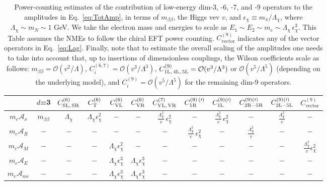 \documentclass[letterpaper,11pt]{article}
\begin{document}
\begin{table}
\center
\footnotesize
\begin{tabular}{||c|ccccccccccc||}
 \hline \hline 
			    & $d$=3  &  $C^{(6)}_{\rm SL,\, SR}$       & $C^{(6)}_{\rm T}$ 		  &  $C^{(6)}_{\rm VL}$  & $C^{(6)}_{\rm VR}$  & $C^{(7)}_{\rm VL, \, VR}$  & $C^{(9)\,(\prime)}_{\rm 1R}$ & $C^{(9)(\prime)}_{\rm 1L}$ & $C^{(9)(\prime)}_{\rm 2R-5R}$ & $C^{(9)(\prime)}_{\rm 2L-5L}$ & $C^{(9)}_{\mathrm{vector}} $ \\
\hline
$m_e \mathcal A_{\nu}$   & $m_{\beta\beta}$ & $\Lambda_{\chi}$  & $\Lambda_{\chi} \epsilon^2_\chi$ &  $-$  &  $-$ & $ \frac{\Lambda_\chi^2}{v} \, \epsilon_\chi^2$  & $-$ & $\frac{\Lambda_\chi^2}{v} \, \epsilon_\chi^2$ & $ -$ & $\frac{\Lambda_\chi^2}{v} $ & $-$\\
$m_e \mathcal A_{R}$   & $-$ & $-$  & $-$ &  $-$  &  $-$ &   $-$  & $ \frac{\Lambda_\chi^2}{v} \, \epsilon_\chi^2$ & $-$ & $ \frac{\Lambda_\chi^2}{v}$ & $-$ & $-$ \\
$m_e \mathcal A_{M}$        & $-$ 	       & $-$ 		   & $-$ &  $\Lambda_{\chi} \epsilon^2_\chi$ & $-$ & $-$ & $-$ & $-$  & $-$ & $-$ &  $ \frac{\Lambda_\chi^2}{v} \epsilon_\chi^2$   \\
$m_e \mathcal A_{E}$        & $-$ 	       & $-$  		   & $-$ &  $\Lambda_{\chi} \epsilon^3_\chi$ & $\Lambda_{\chi} \epsilon^3_\chi$ & $-$ & $-$ & $-$  &$-$ & $-$  & $-$  \\
$m_e \mathcal A_{me}$       & $-$ 	       & $-$  		   & $-$ &  $\Lambda_{\chi} \epsilon^3_\chi$ & $\Lambda_{\chi} \epsilon^3_\chi$ & $-$ & $-$ & $-$  & $-$ & $-$  & $-$ \\
\hline
\end{tabular}
\caption{
Power-counting estimates  of the contribution of low-energy dim-3, -6, -7, and -9 operators to the amplitudes in Eq.~\eqref{eq:TotAmp}, 
in terms of  $m_{\beta \beta}$,  the Higgs vev  $v$,  and  $\epsilon_\chi \equiv m_\pi/\Lambda_\chi$, where $\Lambda_\chi \sim m_N \sim 1$ GeV. 
We take the electron mass and energies  to scale as $E_1 \sim E_2 \sim m_e \sim \Lambda_\chi \, \epsilon_\chi^3$. 
This  Table assumes the NMEs to follow the chiral EFT power counting. 
$C_{\mathrm{vector}}^{(9)}$ indicates any of the vector operators in Eq.~\eqref{eq:Lag}.
Finally, note that  to estimate the overall scaling of the amplitudes one needs to take into account that, 
up to  insertions of  dimensionless couplings, 
the Wilson coefficients  scale as follows:  
$m_{\beta \beta} = \mathcal O(v^2/\Lambda)$,      $C^{(6,7)}_i = \mathcal O(v^3/\Lambda^3)$,  
 $C^{(9)}_{\rm 1 L,\, 4L,\, 5L}= \mathcal O(v^3/\Lambda^3)$ or $\mathcal O(v^5/\Lambda^5)$ (depending on the underlying model), and 
$C^{(9)}_i = \mathcal O(v^5/\Lambda^5)$ for the remaining dim-9 operators. }\label{TabPC}
\end{table}
\end{document}
